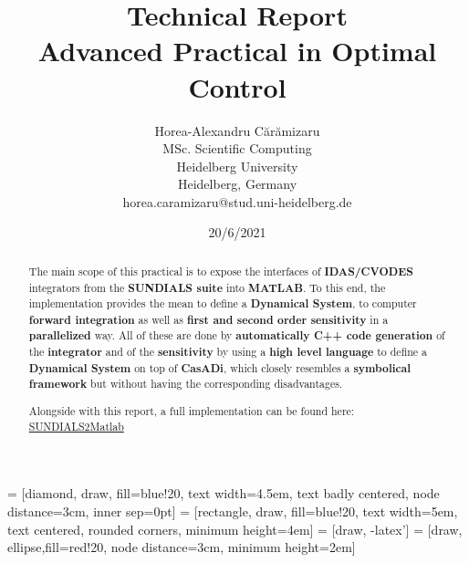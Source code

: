 \documentclass[12pt, letterpaper]{article}
\begin{document}
 = [diamond, draw, fill=blue!20, 
    text width=4.5em, text badly centered, node distance=3cm, inner sep=0pt]
 = [rectangle, draw, fill=blue!20, 
    text width=5em, text centered, rounded corners, minimum height=4em]
 = [draw, -latex']
 = [draw, ellipse,fill=red!20, node distance=3cm,
    minimum height=2em]


\title{Technical Report \\  Advanced Practical in Optimal Control }



\author{ Horea-Alexandru C\u{a}r\u{a}mizaru \\
MSc. Scientific Computing\\
Heidelberg University \\
Heidelberg, Germany \\
horea.caramizaru@stud.uni-heidelberg.de
}
\date{20/6/2021}


\maketitle

\begin{abstract}

The main scope of this practical is to expose the interfaces of \textbf{IDAS/CVODES} integrators from the \textbf{SUNDIALS suite} \cite{hindmarsh2005sundials} into \textbf{MATLAB}. To this end, the implementation provides the mean to define a \textbf{Dynamical System}, to computer \textbf{forward integration} as well as \textbf{first and second order sensitivity} in a \textbf{ parallelized} way. All of these are done by \textbf{automatically C++ code generation} of the \textbf{integrator} and of the \textbf{sensitivity} by using a \textbf{high level language} to define a \textbf{Dynamical System} on top of \textbf{CasADi}, which closely resembles a \textbf{symbolical framework} but without having the corresponding disadvantages.

Alongside with this report, a full implementation can be found here: \href{https://github.com/nashmit/SUNDIALS2Matlab}{SUNDIALS2Matlab}

\end{abstract}
\end{document}
